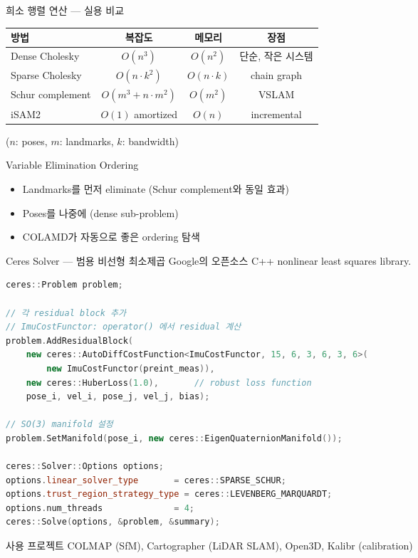 \begin{frame}{희소 행렬 연산 — 실용 비교}
  \begin{center}
  \begin{tabular}{lccc}
    \toprule
    \textbf{방법} & \textbf{복잡도} & \textbf{메모리} & \textbf{장점} \\
    \midrule
    Dense Cholesky & $O(n^3)$ & $O(n^2)$ & 단순, 작은 시스템 \\
    Sparse Cholesky & $O(n\cdot k^2)$ & $O(n\cdot k)$ & chain graph \\
    Schur complement & $O(m^3 + n\cdot m^2)$ & $O(m^2)$ & VSLAM \\
    iSAM2 & $O(1)$ amortized & $O(n)$ & incremental \\
    \bottomrule
  \end{tabular}
  \end{center}
  ($n$: poses, $m$: landmarks, $k$: bandwidth)
  \pause
  \vspace{0.3em}
  \begin{block}{Variable Elimination Ordering}
    \begin{itemize}
      \item Landmarks를 먼저 eliminate (Schur complement와 동일 효과)
      \item Poses를 나중에 (dense sub-problem)
      \item COLAMD가 자동으로 좋은 ordering 탐색
    \end{itemize}
  \end{block}
\end{frame}

\begin{frame}[fragile, shrink=25]{Ceres Solver — 범용 비선형 최소제곱}
  Google의 오픈소스 C++ nonlinear least squares library.
  \begin{lstlisting}[language=C++]
ceres::Problem problem;

// 각 residual block 추가
// ImuCostFunctor: operator() 에서 residual 계산
problem.AddResidualBlock(
    new ceres::AutoDiffCostFunction<ImuCostFunctor, 15, 6, 3, 6, 3, 6>(
        new ImuCostFunctor(preint_meas)),
    new ceres::HuberLoss(1.0),       // robust loss function
    pose_i, vel_i, pose_j, vel_j, bias);

// SO(3) manifold 설정
problem.SetManifold(pose_i, new ceres::EigenQuaternionManifold());

ceres::Solver::Options options;
options.linear_solver_type       = ceres::SPARSE_SCHUR;
options.trust_region_strategy_type = ceres::LEVENBERG_MARQUARDT;
options.num_threads              = 4;
ceres::Solve(options, &problem, &summary);
  \end{lstlisting}
  \begin{exampleblock}{사용 프로젝트}
    COLMAP (SfM), Cartographer (LiDAR SLAM), Open3D, Kalibr (calibration)
  \end{exampleblock}
\end{frame}

